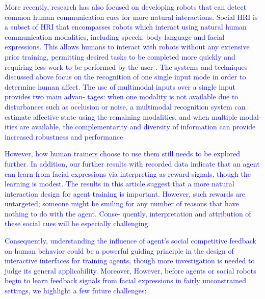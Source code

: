 \textcolor{blue}{More recently, research has also focused on developing robots that can detect common human communication cues for more natural interactions. Social HRI is a subset of HRI that encompasses robots which interact using natural human communication modalities, including speech, body language and facial expressions. This allows humans to interact with robots without any extensive prior training, permitting desired tasks to be completed more quickly and requiring less work to be performed by the user \cite{mccoll2016survey}. 
The systems and techniques discussed above focus on the recognition of one single input mode in order to determine human affect. The use of multimodal inputs over a single input provides two main advan- tages: when one modality is not available due to disturbances such as occlusion or noise, a multimodal recognition system can estimate affective state using the remaining modalities, and when multiple modal- ities are available, the complementarity and diversity of information can provide increased robustness and performance}

\textcolor{blue}{%
However, how human trainers choose to use them still needs to be explored further. In addition, our further results with recorded data indicate that an agent can learn from facial expressions via interpreting as reward signals, though the learning is modest. The results in this article suggest that a more natural interaction design for agent training is important. However, such rewards are untargeted; someone might be smiling for any number of reasons that have nothing to do with the agent. Conse- quently, interpretation and attribution of these social cues will be especially challenging. }%

\textcolor{blue}{Consequently, understanding the influence of agent's social competitive feedback %
on human behavior could be a powerful guiding principle in the design of interactive interfaces for training agents, though more investigation is needed to judge its general applicability. Moreover, 
However, before agents or social robots begin to learn feedback signals from facial expressions in fairly unconstrained settings, we highlight a few future challenges: }%

